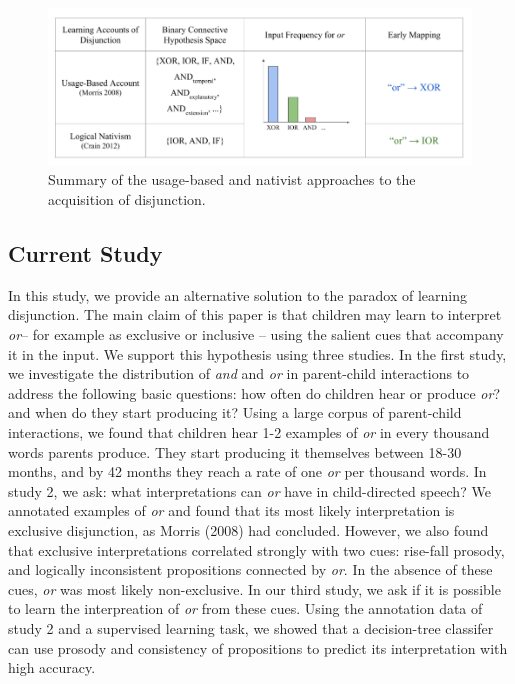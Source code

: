 \documentclass[,man,floatsintext]{apa6}
\begin{document}
\begin{figure}[tb]

{\centering \includegraphics{figs/theories-1} 

}

\caption{Summary of the usage-based and nativist approaches to the acquisition of disjunction.}\label{fig:theories}
\end{figure}

\hypertarget{current-study}{%
\subsection{Current Study}\label{current-study}}

In this study, we provide an alternative solution to the paradox of learning disjunction. The main claim of this paper is that children may learn to interpret \emph{or}-- for example as exclusive or inclusive -- using the salient cues that accompany it in the input. We support this hypothesis using three studies. In the first study, we investigate the distribution of \emph{and} and \emph{or} in parent-child interactions to address the following basic questions: how often do children hear or produce \emph{or}? and when do they start producing it? Using a large corpus of parent-child interactions, we found that children hear 1-2 examples of \emph{or} in every thousand words parents produce. They start producing it themselves between 18-30 months, and by 42 months they reach a rate of one \emph{or} per thousand words. In study 2, we ask: what interpretations can \emph{or} have in child-directed speech? We annotated examples of \emph{or} and found that its most likely interpretation is exclusive disjunction, as Morris (2008) had concluded. However, we also found that exclusive interpretations correlated strongly with two cues: rise-fall prosody, and logically inconsistent propositions connected by \emph{or}. In the absence of these cues, \emph{or} was most likely non-exclusive. In our third study, we ask if it is possible to learn the interpreation of \emph{or} from these cues. Using the annotation data of study 2 and a supervised learning task, we showed that a decision-tree classifer can use prosody and consistency of propositions to predict its interpretation with high accuracy.
\end{document}
